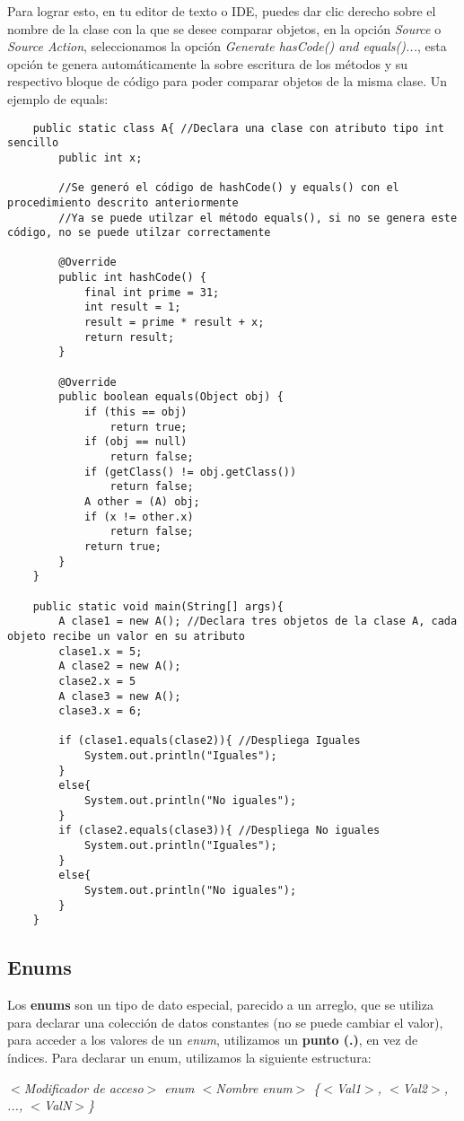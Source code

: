 Para lograr esto, en tu editor de texto o IDE, puedes dar clic derecho sobre el nombre de la clase con la que se desee comparar objetos, en la opción \textit{Source} o \textit{Source Action}, seleccionamos la opción \textit{Generate hasCode() and equals()...}, esta opción te genera automáticamente la sobre escritura de los métodos y su respectivo bloque de código para poder comparar objetos de la misma clase. Un ejemplo de equals:
\begin{lstlisting}
    public static class A{ //Declara una clase con atributo tipo int sencillo
        public int x;
        
        //Se generó el código de hashCode() y equals() con el procedimiento descrito anteriormente
        //Ya se puede utilzar el método equals(), si no se genera este código, no se puede utilzar correctamente
        
        @Override
        public int hashCode() {
            final int prime = 31;
            int result = 1;
            result = prime * result + x;
            return result;
        }

        @Override
        public boolean equals(Object obj) {
            if (this == obj)
                return true;
            if (obj == null)
                return false;
            if (getClass() != obj.getClass())
                return false;
            A other = (A) obj;
            if (x != other.x)
                return false;
            return true;
        }
    }
    
    public static void main(String[] args){
        A clase1 = new A(); //Declara tres objetos de la clase A, cada objeto recibe un valor en su atributo
        clase1.x = 5;
        A clase2 = new A();
        clase2.x = 5
        A clase3 = new A();
        clase3.x = 6;
        
        if (clase1.equals(clase2)){ //Despliega Iguales
            System.out.println("Iguales"); 
        }
        else{
            System.out.println("No iguales");
        }
        if (clase2.equals(clase3)){ //Despliega No iguales
            System.out.println("Iguales");
        }
        else{
            System.out.println("No iguales");
        }
    }
\end{lstlisting}


\subsection{Enums}
\hspace{0.55cm}Los \textbf{enums} son un tipo de dato especial, parecido a un arreglo, que se utiliza para declarar una colección de datos constantes (no se puede cambiar el valor), para acceder a los valores de un \textit{enum}, utilizamos un \textbf{punto (.)}, en vez de índices. Para declarar un enum, utilizamos la siguiente estructura:
\begin{center}
    \textit{$<$Modificador de acceso$>$ enum $<$Nombre enum$>$ \{$<$Val1$>$, $<$Val2$>$, ..., $<$ValN$>$\}}
\end{center}

